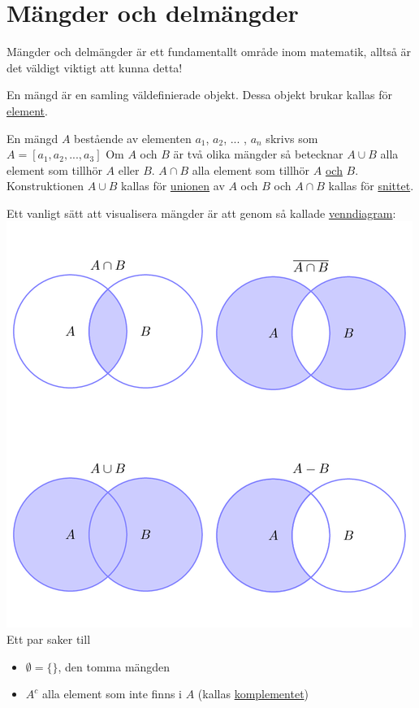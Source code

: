 \chapter{Mängder och delmängder}
Mängder och delmängder är ett fundamentallt område inom matematik, alltså är det väldigt viktigt att kunna detta!

En mängd är en samling väldefinierade objekt.
Dessa objekt brukar kallas för \underline{element}.

En mängd $A$ bestående av elementen $a_1$, $a_2$, ... , $a_n$ skrivs som $A=[a_1,a_2, ... ,a_3]$
Om $A$ och $B$ är två olika mängder så betecknar $A\cup B$ alla element som tillhör $A$ eller $B$.
$A\cap B$ alla element som tillhör $A$ \underline{och} $B$.
Konstruktionen $A\cup B$ kallas för \underline{unionen} av $A$ och $B$ och $A\cap B$ kallas för \underline{snittet}.

Ett vanligt sätt att visualisera mängder är att genom så kallade \underline{venndiagram}:\\
\includegraphics[scale=0.5]{lessons/lesson01/imgs/img01.png}
Ett par saker till
\begin{itemize}
    \item $\emptyset=\{\}$, den tomma mängden
    \item $A^c$ alla element som inte finns i $A$ (kallas \underline{komplementet})
\end{itemize}

